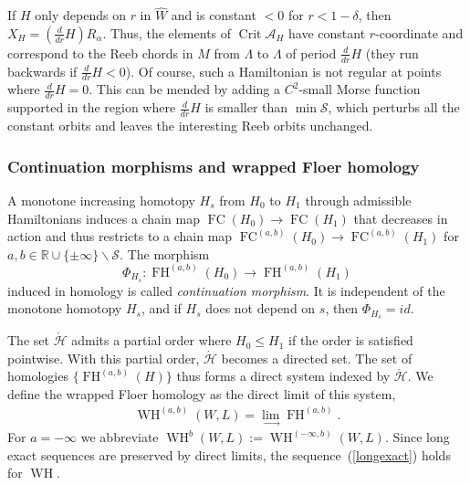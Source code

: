 \documentclass{amsart}
\newcommand{\Acal}{{\mathcal{A}}}
\newcommand{\Hcal}{{\mathcal{H}}}
\newcommand{\Scal}{{\mathcal{S}}}
\newcommand{\RR}{\mathbb{R}}
\newcommand{\FH}{\operatorname{FH}}
\newcommand{\FC}{\operatorname{FC}}
\newcommand{\WslantH}{\operatorname{WH}}
\newcommand{\Crit}{\operatorname{Crit}}
\newcommand{\haat}{\widehat}
\theoremstyle{definition}
\theoremstyle{remark}
\numberwithin{equation}{section}
\begin{document}
If $H$ only depends on $r$ in $\haat W$ and is constant $<0$ for $r<1-\delta$, then $X_H=(\frac d{dr}H) R_{\alpha}$. Thus, the elements of $\Crit\Acal_H$ have constant $r$-coordinate and correspond to the Reeb chords in $M$ from $\Lambda$ to $\Lambda$ of period $\frac d{dr}H$ (they run backwards if $\frac d{dr}H<0$). Of course, such a Hamiltonian is not regular at points where $\frac d{dr}H=0$. This can be mended by adding a $C^2$-small Morse function supported in the region where $\frac d{dr}H$ is smaller than $\min\Scal$, which perturbs all the constant orbits and leaves the interesting Reeb orbits unchanged. 


\subsubsection*{Continuation morphisms and wrapped Floer homology}
A monotone increasing homotopy $H_s$ from $H_0$ to $H_1$ through admissible Hamiltonians induces a chain map $\FC(H_0)\to \FC(H_1)$ that decreases in action and thus restricts to a chain map $\FC^{(a,b)}(H_0)\to \FC^{(a,b)}(H_1)$ for $a,b\in\RR\cup\{\pm\infty\}\backslash\Scal$. The morphism 
\begin{equation*}\Phi_{H_s}:\FH^{(a,b)}(H_0)\to \FH^{(a,b)}(H_1)\end{equation*}
induced in homology is called {\it continuation morphism}. It is independent of the monotone homotopy $H_s$, and if $H_s$ does not depend on $s$, then $\Phi_{H_s}=id$. 

The set $\acute\Hcal$ admits a partial order where $H_0\leq H_1$ if the order is satisfied pointwise. With this partial order, $\acute\Hcal$ becomes a directed set. The set of homologies $\{\FH^{(a,b)}(H)\}$ thus forms a direct system indexed by $\acute\Hcal$. We define the wrapped Floer homology as the direct limit of this system, 
\begin{align*}
	\WslantH^{(a,b)}(W,L)=\lim_{\longrightarrow} \FH^{(a,b)}.
\end{align*}
For $a=-\infty$ we abbreviate $\WslantH^b(W,L):=\WslantH^{(-\infty,b)}(W,L)$. Since long exact sequences are preserved by direct limits, the sequence~(\ref{longexact}) holds for $\WslantH$. 
\end{document}
